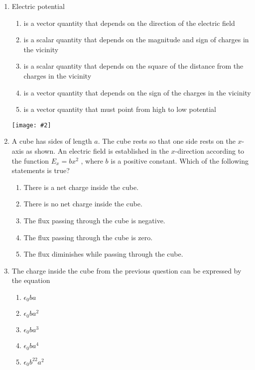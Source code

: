 \documentclass[11pt]{article}
\newcommand{\pic}[2]{\texttt{[image: \#2]}}
\begin{document}
\begin{multicols}{2}
\begin{enumerate}[leftmargin=18pt]
  \item Electric potential
    \begin{enumerate}[noitemsep,topsep=0pt,leftmargin=18pt,label=(\Alph*)]
    \item is a vector quantity that depends on the direction of the electric
      field
    \item is a scalar quantity that depends on the magnitude and sign of charges
      in the vicinity
    \item is a scalar quantity that depends on the square of the distance from
      the charges in the vicinity
    \item is a vector quantity that depends on the sign of the charges in the
      vicinity
    \item is a vector quantity that must point from high to low potential
    \end{enumerate}

    \begin{center}
      \pic{.3}{cube.png}
    \end{center}
  
  \item\vspace{-.2in} A cube has sides of length $a$. The cube rests so that one
    side rests on
    the $x$-axis as shown. An electric field is established in the $x$-direction
    according to the function $E_x=bx^2$ , where $b$ is a positive constant.
    Which of the following statements is true?
    
    \begin{enumerate}[noitemsep,topsep=0pt,leftmargin=18pt,label=(\Alph*)]
    \item There is a net charge inside the cube.
    \item There is no net charge inside the cube.
    \item The flux passing through the cube is negative.
    \item The flux passing through the cube is zero.
    \item The flux diminishes while passing through the cube.
    \end{enumerate}

  \item The charge inside the cube from the previous question can be expressed
    by the equation
    \begin{enumerate}[noitemsep,topsep=0pt,leftmargin=18pt,label=(\Alph*)]
    \item $\epsilon_0ba$
    \item $\epsilon_0ba^2$
    \item $\epsilon_0ba^3$
    \item $\epsilon_0ba^4$
    \item $\epsilon_0b^22a^2$
    \end{enumerate}


\end{enumerate}
\end{multicols}
\end{document}
